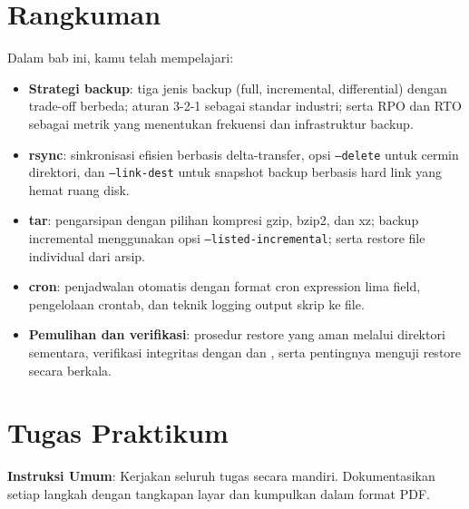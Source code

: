 \section{Rangkuman}
\label{sec:backup-summary}

Dalam bab ini, kamu telah mempelajari:

\begin{itemize}[noitemsep,topsep=2pt]
    \item \textbf{Strategi backup}: tiga jenis backup (full, incremental,
        differential) dengan trade-off berbeda; aturan 3-2-1 sebagai standar
        industri; serta RPO dan RTO sebagai metrik yang menentukan frekuensi
        dan infrastruktur backup.
    \item \textbf{rsync}: sinkronisasi efisien berbasis delta-transfer, opsi
        \texttt{--delete} untuk cermin direktori, dan \texttt{--link-dest} untuk
        snapshot backup berbasis hard link yang hemat ruang disk.
    \item \textbf{tar}: pengarsipan dengan pilihan kompresi gzip, bzip2, dan xz;
        backup incremental menggunakan opsi \texttt{--listed-incremental};
        serta restore file individual dari arsip.
    \item \textbf{cron}: penjadwalan otomatis dengan format cron expression lima
        field, pengelolaan crontab, dan teknik logging output skrip ke file.
    \item \textbf{Pemulihan dan verifikasi}: prosedur restore yang aman melalui
        direktori sementara, verifikasi integritas dengan  dan
        , serta pentingnya menguji restore secara berkala.
\end{itemize}

\section{Tugas Praktikum}
\label{sec:backup-exercises}

\textbf{Instruksi Umum}: Kerjakan seluruh tugas secara mandiri. Dokumentasikan
setiap langkah dengan tangkapan layar dan kumpulkan dalam format PDF.

